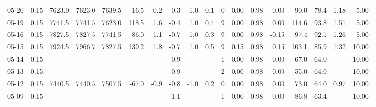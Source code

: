 \begin{threeparttable}
{\begin{tabular}{lrrrrrrrrrrrrrrrrr}
  05-20 &     0.15 & 7623.0 & 7623.0 & 7639.5 &      -16.5 &           -0.2 &                      -0.3 &                     -1.0 &                 0.1 &              0 &       0.00 &      0.98 &           0.00 &             90.0 &                78.4 &            1.18 &                   5.00 \\
  05-19 &     0.15 & 7741.5 & 7741.5 & 7623.0 &      118.5 &            1.6 &                      -0.4 &                      1.0 &                 0.4 &              9 &       0.00 &      0.98 &           0.00 &            114.6 &                93.8 &            1.51 &                   5.00 \\
  05-16 &     0.15 & 7827.5 & 7827.5 & 7741.5 &       86.0 &            1.1 &                      -0.7 &                      1.0 &                 0.3 &              9 &       0.00 &      0.98 &          -0.15 &             97.4 &                92.1 &            1.26 &                   5.00 \\
  05-15 &     0.15 & 7924.5 & 7966.7 & 7827.5 &      139.2 &            1.8 &                      -0.7 &                      1.0 &                 0.5 &              9 &       0.15 &      0.98 &           0.15 &            103.1 &                85.9 &            1.32 &                  10.00 \\
  05-14 &     0.15 &     -- &     -- &     -- &         -- &             -- &                      -0.9 &                       -- &                  -- &              1 &       0.00 &      0.98 &           0.00 &             67.0 &                64.0 &              -- &                  10.00 \\
  05-13 &     0.15 &     -- &     -- &     -- &         -- &             -- &                      -0.9 &                       -- &                  -- &              2 &       0.00 &      0.98 &           0.00 &             55.0 &                64.0 &              -- &                  10.00 \\
  05-12 &     0.15 & 7440.5 & 7440.5 & 7507.5 &      -67.0 &           -0.9 &                      -0.8 &                     -1.0 &                 0.2 &              0 &       0.00 &      0.98 &           0.00 &             73.0 &                64.0 &            0.97 &                  10.00 \\
  05-09 &     0.15 &     -- &     -- &     -- &         -- &             -- &                      -1.1 &                       -- &                  -- &              1 &       0.00 &      0.98 &           0.00 &             86.8 &                63.4 &              -- &                  10.00 \\

\end{tabular}}
\end{threeparttable}
